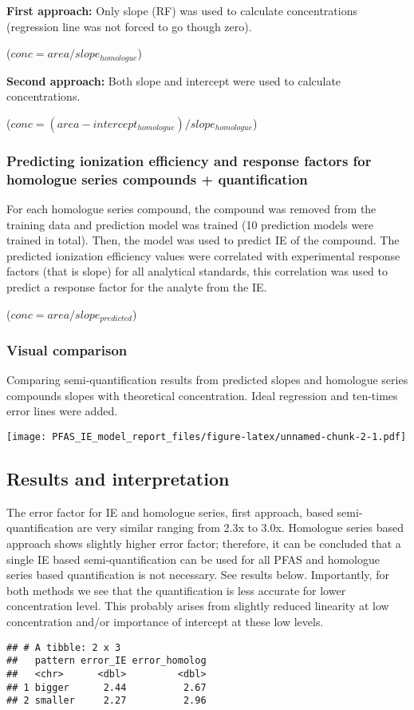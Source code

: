 \documentclass[
]{article}
\begin{document}
\textbf{First approach:} Only slope (RF) was used to calculate
concentrations (regression line was not forced to go though zero).

(\(conc = area/slope_{homologue}\))

\textbf{Second approach:} Both slope and intercept were used to
calculate concentrations.

(\(conc = (area-intercept_{homologue})/slope_{homologue}\))

\hypertarget{predicting-ionization-efficiency-and-response-factors-for-homologue-series-compounds-quantification}{%
\subsubsection{Predicting ionization efficiency and response factors for
homologue series compounds +
quantification}\label{predicting-ionization-efficiency-and-response-factors-for-homologue-series-compounds-quantification}}

For each homologue series compound, the compound was removed from the
training data and prediction model was trained (10 prediction models
were trained in total). Then, the model was used to predict IE of the
compound. The predicted ionization efficiency values were correlated
with experimental response factors (that is slope) for all analytical
standards, this correlation was used to predict a response factor for
the analyte from the IE.

(\(conc = area/slope_{predicted}\))

\hypertarget{visual-comparison}{%
\subsubsection{Visual comparison}\label{visual-comparison}}

Comparing semi-quantification results from predicted slopes and
homologue series compounds slopes with theoretical concentration. Ideal
regression and ten-times error lines were added.

\texttt{[image: PFAS\_IE\_model\_report\_files/figure-latex/unnamed-chunk-2-1.pdf]}

\hypertarget{results-and-interpretation}{%
\subsection{Results and
interpretation}\label{results-and-interpretation}}

The error factor for IE and homologue series, first approach, based
semi-quantification are very similar ranging from 2.3x to 3.0x.
Homologue series based approach shows slightly higher error factor;
therefore, it can be concluded that a single IE based
semi-quantification can be used for all PFAS and homologue series based
quantification is not necessary. See results below. Importantly, for
both methods we see that the quantification is less accurate for lower
concentration level. This probably arises from slightly reduced
linearity at low concentration and/or importance of intercept at these
low levels.

\begin{verbatim}
## # A tibble: 2 x 3
##   pattern error_IE error_homolog
##   <chr>      <dbl>         <dbl>
## 1 bigger      2.44          2.67
## 2 smaller     2.27          2.96
\end{verbatim}
\end{document}
